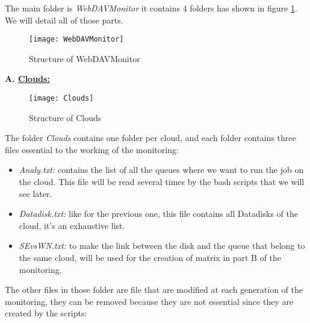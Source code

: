 The main folder is \textit{WebDAVMonitor} it contains 4 folders has shown in figure \ref{fig:WebDAVMonitor}. We will detail all of those parts.\\

\begin{figure}
	\center
	\texttt{[image: WebDAVMonitor]}
	\caption{Structure of WebDAVMonitor}
	\label{fig:WebDAVMonitor}
\end{figure}

\indent \textbf{A. \underline{Clouds:}}\\

\begin{figure}
	\center
	\texttt{[image: Clouds]}
	\caption{Structure of Clouds}
	\label{fig:Clouds}
\end{figure}

The folder \textit{Clouds} contains one folder per cloud, and each folder contains three files essential to the working of the monitoring:
\begin{itemize}
	\item \textit{Analy.txt:} contains the list of all the queues where we want to run the job on the cloud. This file will be read several times by the bash scripts that we will see later.
	\item \textit{Datadisk.txt:} like for the previous one, this file contains all Datadisks of the cloud, it's an exhaustive list.
	\item \textit{SEvsWN.txt:} to make the link between the disk and the queue that belong to the same cloud, will be used for the creation of matrix in part B of the monitoring.
\end{itemize}

The other files in those folder are file that are modified at each generation of the monitoring, they can be removed because they are not essential since they are created by the scripts:

